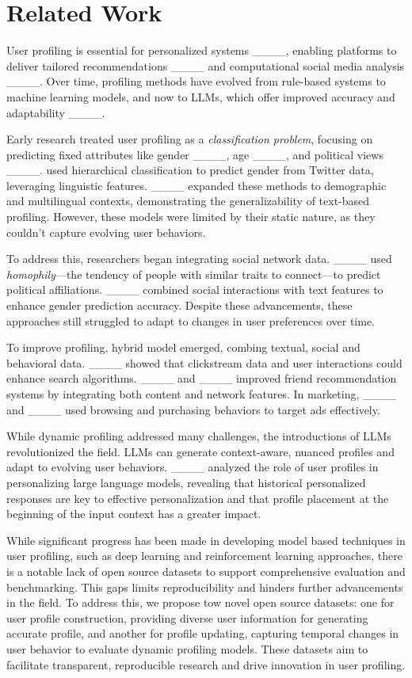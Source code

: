 \section{Related Work}

User profiling is essential for personalized systems ____, enabling platforms to deliver tailored recommendations ____ and computational social media analysis ____. Over time, profiling methods have evolved from rule-based systems to machine learning models, and now to LLMs, which offer improved accuracy and adaptability ____. 

Early research treated user profiling as a \textit{classification problem}, focusing on predicting fixed attributes like gender ____, age ____, and political views ____. used hierarchical classification to predict gender from Twitter data, leveraging linguistic features. ____ expanded these methods to demographic and multilingual contexts, demonstrating the generalizability of text-based profiling. However, these models were limited by their static nature, as they couldn’t capture evolving user behaviors.

To address this, researchers began integrating social network data. ____ used \textit{homophily}—the tendency of people with similar traits to connect—to predict political affiliations. ____ combined social interactions with text features to enhance gender prediction accuracy. Despite these advancements, these approaches still struggled to adapt to changes in user preferences over time.

To improve profiling, hybrid model emerged, combing textual, social and behavioral data. ____ showed that clickstream data and user interactions could enhance search algorithms. ____ and ____ improved friend recommendation systems by integrating both content and network features. In marketing, ____ and ____ used browsing and purchasing behaviors to target ads effectively.

While dynamic profiling addressed many challenges, the introductions of LLMs revolutionized the field. LLMs can generate context-aware, nuanced profiles and adapt to evolving user behaviors. ____ analyzed the role of user profiles in personalizing large language models, revealing that historical personalized responses are key to effective personalization and that profile placement at the beginning of the input context has a greater impact.

While significant progress has been made in developing model based techniques in user profiling, such as deep learning and reinforcement learning approaches, there is a notable lack of open source datasets to support comprehensive evaluation and benchmarking. This gaps limits reproducibility and hinders further advancements in the field. To address this, we propose tow novel open source datasets: one for user profile construction, providing diverse user information for generating accurate profile, and another for profile updating, capturing temporal changes in user behavior to evaluate dynamic profiling models. These datasets aim to facilitate transparent, reproducible research and drive innovation in user profiling.


